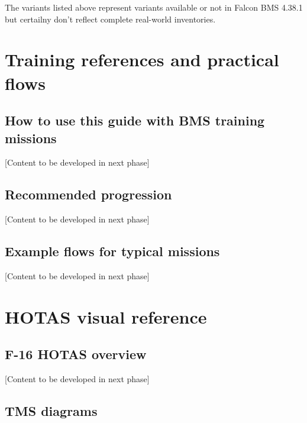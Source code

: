 \documentclass[11pt, a4paper, twoside]{report}
\begin{document}
The variants listed above represent variants available or not in Falcon BMS 4.38.1 but certailny don't reflect complete real-world inventories.
\newpage
\chapter{Training references and practical flows}
\label{chap:C6}

\section{How to use this guide with BMS training missions}
\label{sec:C6-S1}

[Content to be developed in next phase]

\section{Recommended progression}
\label{sec:C6-S2}

[Content to be developed in next phase]

\section{Example flows for typical missions}
\label{sec:C6-S3}

[Content to be developed in next phase]
\newpage
\chapter{HOTAS visual reference}
\label{chap:C7}

\section{F-16 HOTAS overview}
\label{sec:C7-S1}

[Content to be developed in next phase]

\section{TMS diagrams}
\label{sec:C7-S2}
\end{document}
